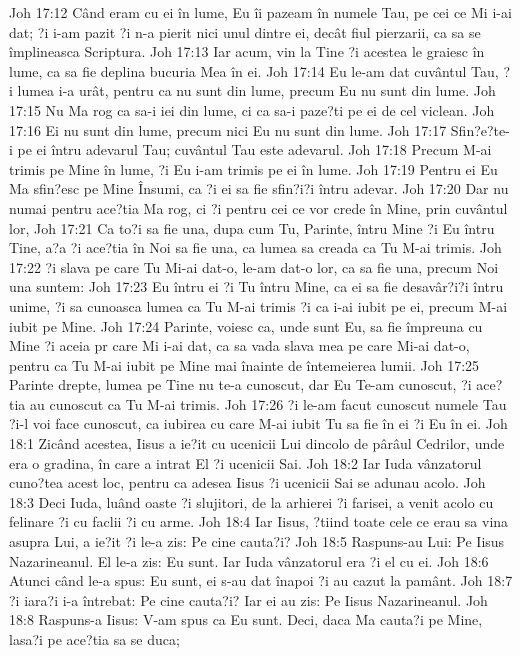 Joh 17:12  Când eram cu ei în lume, Eu îi pazeam în numele Tau, pe cei ce Mi i-ai dat; ?i i-am pazit ?i n-a pierit nici unul dintre ei, decât fiul pierzarii, ca sa se împlineasca Scriptura.
Joh 17:13  Iar acum, vin la Tine ?i acestea le graiesc în lume, ca sa fie deplina bucuria Mea în ei.
Joh 17:14  Eu le-am dat cuvântul Tau, ?i lumea i-a urât, pentru ca nu sunt din lume, precum Eu nu sunt din lume.
Joh 17:15  Nu Ma rog ca sa-i iei din lume, ci ca sa-i paze?ti pe ei de cel viclean.
Joh 17:16  Ei nu sunt din lume, precum nici Eu nu sunt din lume.
Joh 17:17  Sfin?e?te-i pe ei întru adevarul Tau; cuvântul Tau este adevarul.
Joh 17:18  Precum M-ai trimis pe Mine în lume, ?i Eu i-am trimis pe ei în lume.
Joh 17:19  Pentru ei Eu Ma sfin?esc pe Mine Însumi, ca ?i ei sa fie sfin?i?i întru adevar.
Joh 17:20  Dar nu numai pentru ace?tia Ma rog, ci ?i pentru cei ce vor crede în Mine, prin cuvântul lor,
Joh 17:21  Ca to?i sa fie una, dupa cum Tu, Parinte, întru Mine ?i Eu întru Tine, a?a ?i ace?tia în Noi sa fie una, ca lumea sa creada ca Tu M-ai trimis.
Joh 17:22  ?i slava pe care Tu Mi-ai dat-o, le-am dat-o lor, ca sa fie una, precum Noi una suntem:
Joh 17:23  Eu întru ei ?i Tu întru Mine, ca ei sa fie desavâr?i?i întru unime, ?i sa cunoasca lumea ca Tu M-ai trimis ?i ca i-ai iubit pe ei, precum M-ai iubit pe Mine.
Joh 17:24  Parinte, voiesc ca, unde sunt Eu, sa fie împreuna cu Mine ?i aceia pr care Mi i-ai dat, ca sa vada slava mea pe care Mi-ai dat-o, pentru ca Tu M-ai iubit pe Mine mai înainte de întemeierea lumii.
Joh 17:25  Parinte drepte, lumea pe Tine nu te-a cunoscut, dar Eu Te-am cunoscut, ?i ace?tia au cunoscut ca Tu M-ai trimis.
Joh 17:26  ?i le-am facut cunoscut numele Tau ?i-l voi face cunoscut, ca iubirea cu care M-ai iubit Tu sa fie în ei ?i Eu în ei.
Joh 18:1  Zicând acestea, Iisus a ie?it cu ucenicii Lui dincolo de pârâul Cedrilor, unde era o gradina, în care a intrat El ?i ucenicii Sai.
Joh 18:2  Iar Iuda vânzatorul cuno?tea acest loc, pentru ca adesea Iisus ?i ucenicii Sai se adunau acolo.
Joh 18:3  Deci Iuda, luând oaste ?i slujitori, de la arhierei ?i farisei, a venit acolo cu felinare ?i cu faclii ?i cu arme.
Joh 18:4  Iar Iisus, ?tiind toate cele ce erau sa vina asupra Lui, a ie?it ?i le-a zis: Pe cine cauta?i?
Joh 18:5  Raspuns-au Lui: Pe Iisus Nazarineanul. El le-a zis: Eu sunt. Iar Iuda vânzatorul era ?i el cu ei.
Joh 18:6  Atunci când le-a spus: Eu sunt, ei s-au dat înapoi ?i au cazut la pamânt.
Joh 18:7  ?i iara?i i-a întrebat: Pe cine cauta?i? Iar ei au zis: Pe Iisus Nazarineanul.
Joh 18:8  Raspuns-a Iisus: V-am spus ca Eu sunt. Deci, daca Ma cauta?i pe Mine, lasa?i pe ace?tia sa se duca;

